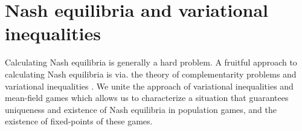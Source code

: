 \section{Nash equilibria and variational inequalities}
Calculating Nash equilibria is generally a hard problem. A fruitful approach to calculating Nash equilibria is via. the theory of complementarity problems and variational inequalities \citep{karamardian1969nonlinear,nabetani2011parametrized}. We unite the approach of variational inequalities and mean-field games which allows us to characterize a situation that guarantees uniqueness and existence of Nash equilibria in population games, and the existence of fixed-points of these games.


